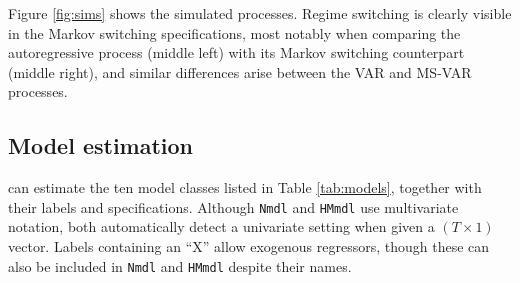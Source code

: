 Figure \ref{fig:sims} shows the simulated processes. Regime switching is clearly visible in the Markov switching specifications, most notably when comparing the autoregressive process (middle left) with its Markov switching counterpart (middle right), and similar differences arise between the VAR and MS-VAR processes.

\subsection{Model estimation}\label{model-estimation}

 can estimate the ten model classes listed in Table \ref{tab:models}, together with their  labels and specifications. Although \texttt{Nmdl} and \texttt{HMmdl} use multivariate notation, both automatically detect a univariate setting when given a \((T \times 1)\) vector. Labels containing an ``X'' allow exogenous regressors, though these can also be included in \texttt{Nmdl} and \texttt{HMmdl} despite their names.

